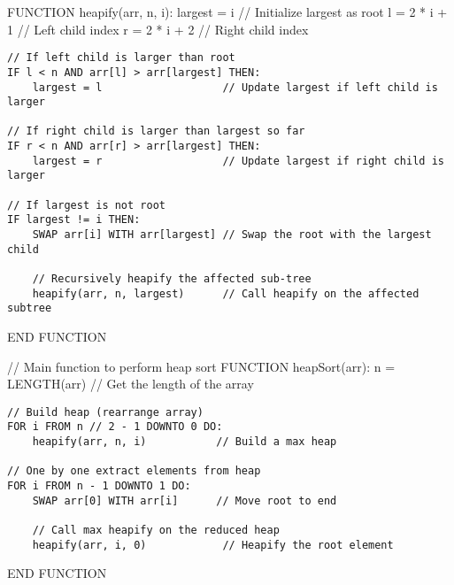 \documentclass[11pt]{article}
\begin{document}
    FUNCTION heapify(arr, n, i): largest = i // Initialize largest as root l
= 2 * i + 1 // Left child index r = 2 * i + 2 // Right child index

\begin{verbatim}
// If left child is larger than root
IF l < n AND arr[l] > arr[largest] THEN:
    largest = l                   // Update largest if left child is larger

// If right child is larger than largest so far
IF r < n AND arr[r] > arr[largest] THEN:
    largest = r                   // Update largest if right child is larger

// If largest is not root
IF largest != i THEN:
    SWAP arr[i] WITH arr[largest] // Swap the root with the largest child

    // Recursively heapify the affected sub-tree
    heapify(arr, n, largest)      // Call heapify on the affected subtree
\end{verbatim}

END FUNCTION

// Main function to perform heap sort FUNCTION heapSort(arr): n =
LENGTH(arr) // Get the length of the array

\begin{verbatim}
// Build heap (rearrange array)
FOR i FROM n // 2 - 1 DOWNTO 0 DO:
    heapify(arr, n, i)           // Build a max heap

// One by one extract elements from heap
FOR i FROM n - 1 DOWNTO 1 DO:
    SWAP arr[0] WITH arr[i]      // Move root to end

    // Call max heapify on the reduced heap
    heapify(arr, i, 0)            // Heapify the root element
\end{verbatim}

END FUNCTION
\end{document}
